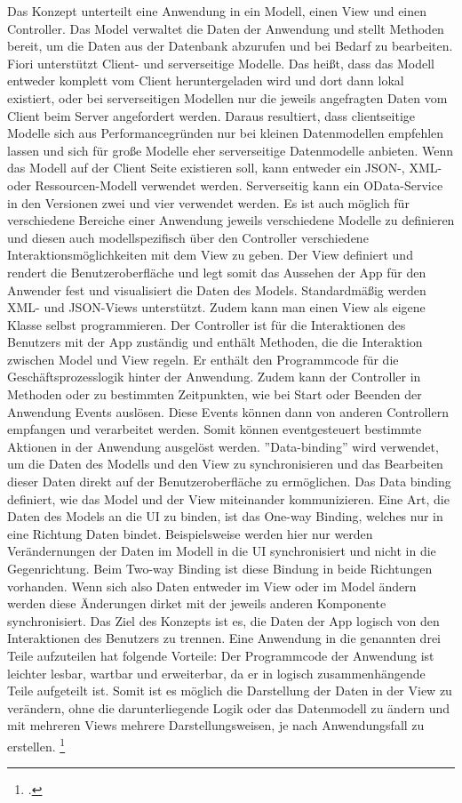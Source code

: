 Das Konzept unterteilt eine Anwendung in ein Modell, einen View und einen Controller. Das Model verwaltet die Daten der Anwendung und stellt Methoden bereit, um die Daten aus der Datenbank abzurufen und bei Bedarf zu bearbeiten. Fiori unterstützt Client- und serverseitige Modelle. Das hei{\ss}t, dass das Modell entweder komplett vom Client heruntergeladen wird und dort dann lokal existiert, oder bei serverseitigen Modellen nur die jeweils angefragten Daten vom Client beim Server angefordert werden. Daraus resultiert, dass clientseitige Modelle sich aus Performancegründen nur bei kleinen Datenmodellen empfehlen lassen und sich für große Modelle eher serverseitige Datenmodelle anbieten. Wenn das Modell auf der Client Seite existieren soll, kann entweder ein JSON-, XML- oder Ressourcen-Modell verwendet werden. Serverseitig kann ein OData-Service in den Versionen zwei und vier verwendet werden. Es ist auch möglich für verschiedene Bereiche einer Anwendung jeweils verschiedene Modelle zu definieren und diesen auch modellspezifisch über den Controller verschiedene Interaktionsmöglichkeiten mit dem View zu geben. Der View definiert und rendert die Benutzeroberfläche und legt somit das Aussehen der App für den Anwender fest und visualisiert die Daten des Models. Standardmä{\ss}ig werden XML- und JSON-Views unterstützt. Zudem kann man einen View als eigene Klasse selbst programmieren. Der Controller ist für die Interaktionen des Benutzers mit der App zuständig und enthält Methoden, die die Interaktion zwischen Model und View regeln. Er enthält den Programmcode für die Geschäftsprozesslogik hinter der Anwendung. Zudem kann der Controller in Methoden oder zu bestimmten Zeitpunkten, wie \zB bei Start oder Beenden der Anwendung Events auslösen. Diese Events können dann von anderen Controllern empfangen und verarbeitet werden. Somit können eventgesteuert bestimmte Aktionen in der Anwendung ausgelöst werden. ''Data-binding'' wird verwendet, um die Daten des Modells und den View zu synchronisieren und das Bearbeiten dieser Daten direkt auf der Benutzeroberfläche zu ermöglichen. Das Data binding definiert, wie das Model und der View miteinander kommunizieren. Eine Art, die Daten des Models an die UI zu binden, ist das One-way Binding, welches nur in eine Richtung Daten bindet. Beispielsweise werden hier nur  werden Verändernungen der Daten im Modell in die UI synchronisiert und nicht in die Gegenrichtung. Beim Two-way Binding ist diese Bindung in beide Richtungen vorhanden. Wenn sich also Daten entweder im View oder im Model ändern werden diese Änderungen dirket mit der jeweils anderen Komponente synchronisiert. Das Ziel des Konzepts ist es, die Daten der App logisch von den Interaktionen des Benutzers zu trennen. Eine Anwendung in die genannten drei Teile aufzuteilen hat folgende Vorteile: Der Programmcode der Anwendung ist leichter lesbar, wartbar und erweiterbar, da er in logisch zusammenhängende Teile aufgeteilt ist. Somit ist es möglich die Darstellung der Daten in der View zu verändern, ohne die darunterliegende Logik oder das Datenmodell zu ändern und mit mehreren Views mehrere Darstellungsweisen, je nach Anwendungsfall zu erstellen. \footcite[Vgl.][]{sap_sapui5-sap-hel-docu_2023}

